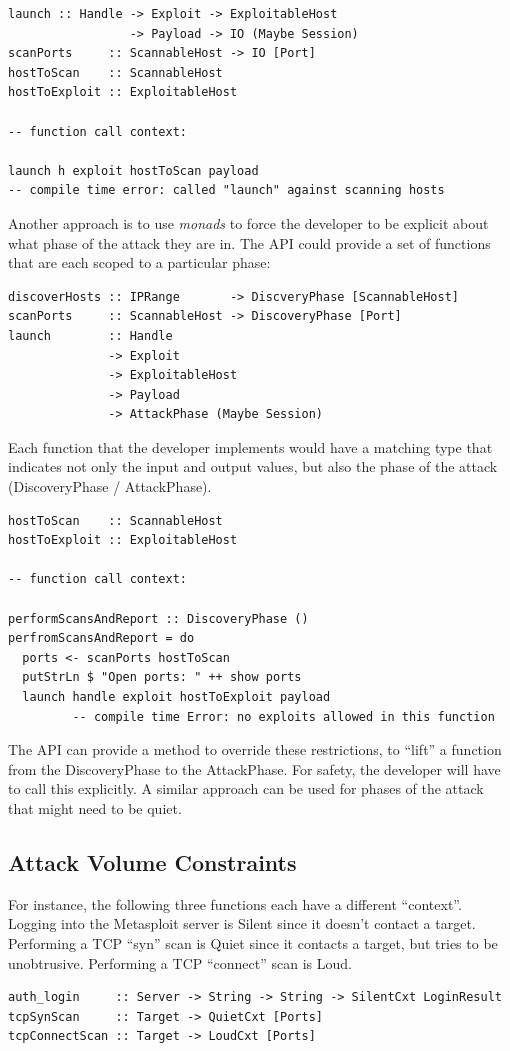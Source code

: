 \documentclass[figure,letterpaper,onefignum]{mysiam}
\begin{document}
\begin{verbatim}
launch :: Handle -> Exploit -> ExploitableHost
                 -> Payload -> IO (Maybe Session)
scanPorts     :: ScannableHost -> IO [Port]
hostToScan    :: ScannableHost
hostToExploit :: ExploitableHost

-- function call context:

launch h exploit hostToScan payload
-- compile time error: called "launch" against scanning hosts
\end{verbatim}
Another approach is to use \emph{monads} to force the developer to be explicit about what phase of the attack they are in. The API could provide a set of functions that are each scoped to a particular phase:

\begin{verbatim}
discoverHosts :: IPRange       -> DiscveryPhase [ScannableHost]
scanPorts     :: ScannableHost -> DiscoveryPhase [Port]
launch        :: Handle
              -> Exploit
              -> ExploitableHost 
              -> Payload
              -> AttackPhase (Maybe Session)
\end{verbatim}
Each function that the developer implements would have a matching type that indicates not only the input and output values, but also the phase of the attack (DiscoveryPhase / AttackPhase).

\begin{verbatim}
hostToScan    :: ScannableHost
hostToExploit :: ExploitableHost

-- function call context:

performScansAndReport :: DiscoveryPhase ()
perfromScansAndReport = do
  ports <- scanPorts hostToScan
  putStrLn $ "Open ports: " ++ show ports
  launch handle exploit hostToExploit payload
         -- compile time Error: no exploits allowed in this function
\end{verbatim}
The API can provide a method to override these restrictions, to ``lift'' a function from the DiscoveryPhase to the AttackPhase. For safety, the developer will have to call this explicitly. A similar approach can be used for phases of the attack that might need to be quiet.

\subsection{Attack Volume Constraints}
For instance, the following three functions each have a different ``context''. Logging into the Metasploit server is Silent since it doesn't contact a target. Performing a TCP ``syn'' scan is Quiet since it contacts a target, but tries to be unobtrusive. Performing a TCP ``connect'' scan is Loud.
\begin{verbatim}
auth_login     :: Server -> String -> String -> SilentCxt LoginResult
tcpSynScan     :: Target -> QuietCxt [Ports]
tcpConnectScan :: Target -> LoudCxt [Ports]
\end{verbatim}
\end{document}
